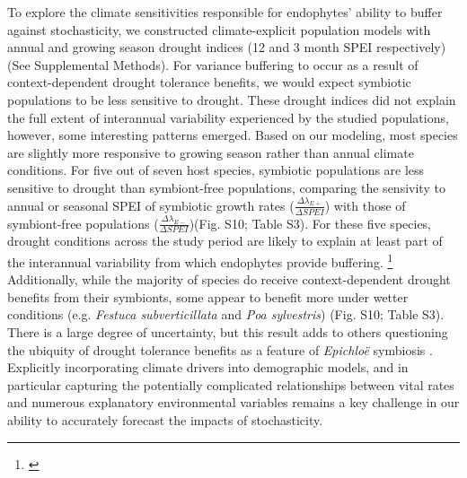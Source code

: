 \documentclass[12pt]{article}
\newcommand{\josh}[2]{{\color{blue}{#1}}\footnote{\textit{\color{blue}{#2}}}}
\begin{document}
To explore the climate sensitivities responsible for endophytes' ability to buffer against stochasticity, we constructed climate-explicit population models with annual and growing season drought indices (12 and 3 month SPEI respectively) (See Supplemental Methods). 
For variance buffering to occur as a result of context-dependent drought tolerance benefits, we would expect symbiotic populations to be less sensitive to drought. 
These drought indices did not explain the full extent of interannual variability experienced by the studied populations, however, some interesting patterns emerged.
Based on our modeling, most species are slightly more responsive to growing season rather than annual climate conditions.
For five out of seven host species, symbiotic populations are less sensitive to drought than symbiont-free populations, comparing the sensivity to annual or seasonal SPEI of symbiotic growth rates ($\frac{\Delta\lambda_{E+}}{\Delta SPEI}$) with those of symbiont-free populations ($\frac{\Delta\lambda_{E-}}{\Delta SPEI}$)(Fig. S10; Table S3). 
For these five species, drought conditions across the study period are likely to explain at least part of the interannual variability from which endophytes provide buffering.
\josh{We did not find a strong relationship between the the magnitude of buffering effects and relative climate sensitivities.}{Not sure what to say about this. There's not really any clear pattern expect that most of the species have at least either growing season or annual drought conditions where the E- are more sensitive, and so variance buffering is possible. But there's not relationship between the magnitude of the difference in sensitivity to the magnitude of variance buffering effect. I have a plot for this, but basically, it's plotting the ratios in table S2 and the effect on CV}
Additionally, while the majority of species do receive context-dependent drought benefits from their symbionts, some appear to benefit more under wetter conditions (e.g. \emph{Festuca subverticillata} and \emph{Poa sylvestris}) (Fig. S10; Table S3). 
There is a large degree of uncertainty, but this result adds to others questioning the ubiquity of drought tolerance benefits as a feature of \emph{Epichlo\"e} symbiosis \cite{decunta2021systematic}. 
Explicitly incorporating climate drivers into demographic models, and in particular capturing the potentially complicated relationships between vital rates and numerous explanatory environmental variables remains a key challenge in our ability to accurately forecast the impacts of stochasticity.
\end{document}
